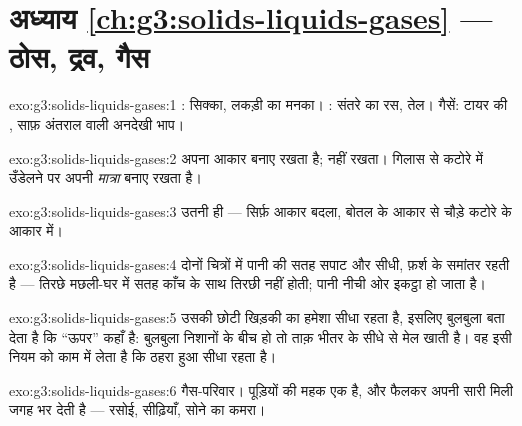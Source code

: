 \section*{अध्याय \ref{ch:g3:solids-liquids-gases} --- ठोस, द्रव, गैस}

\begin{solution}{exo:g3:solids-liquids-gases:1}
: सिक्का, लकड़ी का मनका। : संतरे का रस, तेल। गैसें: टायर की
, साफ़ अंतराल वाली अनदेखी भाप।
\end{solution}

\begin{solution}{exo:g3:solids-liquids-gases:2}
 अपना आकार बनाए रखता है;  नहीं रखता। गिलास से कटोरे में
उँडेलने पर  अपनी \emph{मात्रा} बनाए रखता है।
\end{solution}

\begin{solution}{exo:g3:solids-liquids-gases:3}
उतनी ही --- सिर्फ़ आकार बदला, बोतल के आकार से चौड़े कटोरे के आकार
में।
\end{solution}

\begin{solution}{exo:g3:solids-liquids-gases:4}
दोनों चित्रों में पानी की सतह सपाट और सीधी, फ़र्श के समांतर रहती है
--- तिरछे मछली-घर में सतह काँच के साथ तिरछी नहीं होती; पानी नीची ओर
इकट्ठा हो जाता है।
\end{solution}

\begin{solution}{exo:g3:solids-liquids-gases:5}
उसकी छोटी खिड़की का  हमेशा सीधा रहता है, इसलिए बुलबुला बता देता
है कि ``ऊपर'' कहाँ है: बुलबुला निशानों के बीच हो तो ताक़ भीतर के सीधे
 से मेल खाती है। वह इसी नियम को काम में लेता है कि ठहरा हुआ 
सीधा रहता है।
\end{solution}

\begin{solution}{exo:g3:solids-liquids-gases:6}
गैस-परिवार। पूड़ियों की महक एक  है, और  फैलकर अपनी सारी मिली
जगह भर देती है --- रसोई, सीढ़ियाँ, सोने का कमरा।
\end{solution}

